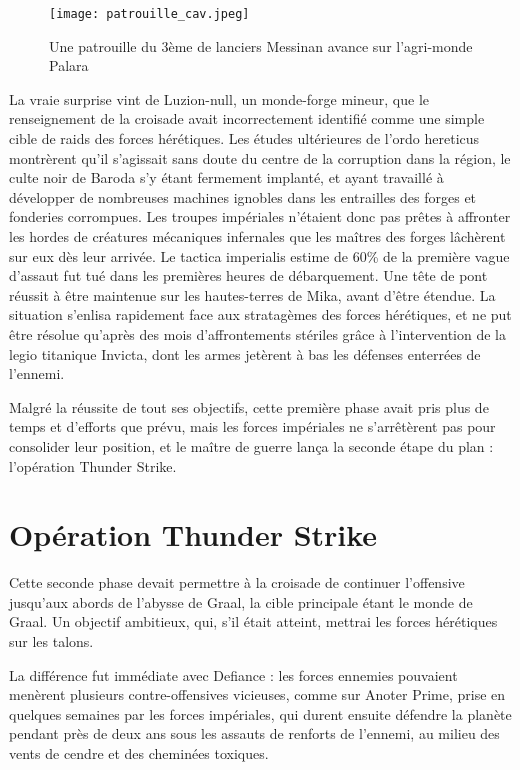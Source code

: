 \documentclass[10pt,a4paper]{book}
\begin{document}
\begin{wrapfigure}{r}{0.3\textwidth}
  \centering
  \texttt{[image: patrouille\_cav.jpeg]}
  \caption{Une patrouille du 3ème de lanciers Messinan avance sur l'agri-monde Palara}
\end{wrapfigure}

La vraie surprise vint de Luzion-null, un monde-forge mineur, que le renseignement de la croisade avait incorrectement identifié comme une simple cible de raids des forces hérétiques. Les études ultérieures de l'ordo hereticus montrèrent qu'il s'agissait sans doute du centre de la corruption dans la région, le culte noir de Baroda s'y étant fermement implanté, et ayant travaillé à développer de nombreuses machines ignobles dans les entrailles des forges et fonderies corrompues. Les troupes impériales n'étaient donc pas prêtes à affronter les hordes de créatures mécaniques infernales que les maîtres des forges lâchèrent sur eux dès leur arrivée. Le tactica imperialis estime de 60\% de la première vague d'assaut fut tué dans les premières heures de débarquement. Une tête de pont réussit à être maintenue sur les hautes-terres de Mika, avant d'être étendue. La situation s'enlisa rapidement face aux stratagèmes des forces hérétiques, et ne put être résolue qu'après des mois d'affrontements stériles grâce à l'intervention de la legio titanique Invicta, dont les armes jetèrent à bas les défenses enterrées de l'ennemi.

Malgré la réussite de tout ses objectifs, cette première phase avait pris plus de temps et d'efforts que prévu, mais les forces impériales ne s'arrêtèrent pas pour consolider leur position, et le maître de guerre lança la seconde étape du plan : l'opération Thunder Strike.
\section{Opération Thunder Strike}
Cette seconde phase devait permettre à la croisade de continuer l'offensive jusqu'aux abords de l'abysse de Graal, la cible principale étant le monde de Graal. Un objectif ambitieux, qui, s'il était atteint, mettrai les forces hérétiques sur les talons.

La différence fut immédiate avec Defiance : les forces ennemies pouvaient menèrent plusieurs contre-offensives vicieuses, comme sur Anoter Prime, prise en quelques semaines par les forces impériales, qui durent ensuite défendre la planète pendant près de deux ans sous les assauts de renforts de l'ennemi, au milieu des vents de cendre et des cheminées toxiques.
\end{document}
